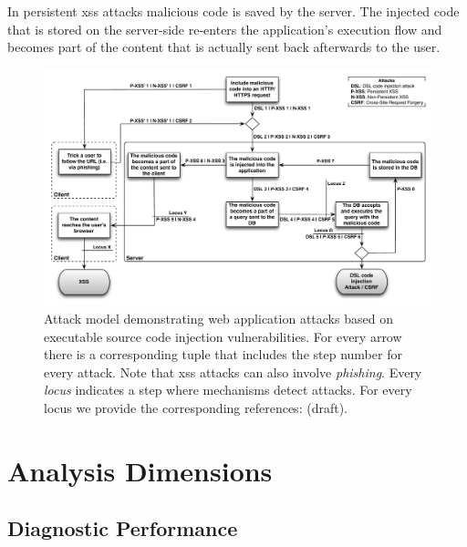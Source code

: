 \documentclass[conference]{IEEEtran}
\begin{document}
In persistent {\sc xss} attacks malicious code is saved by the server.
The injected code that is stored on the server-side re-enters the
application's execution flow and becomes part of the content that is
actually sent back afterwards to the user.

\begin{figure}
\begin{center}
\leavevmode
\includegraphics[scale=0.55]{attacks-steps.pdf}
\end{center}
\caption{\label{fig:attacks}Attack model demonstrating web
application attacks based on executable source
code injection vulnerabilities. For every arrow there is a
corresponding tuple that includes the step number for
every attack. Note that {\sc xss} attacks can also involve
{\it phishing}. Every {\it locus} indicates a step where mechanisms
detect attacks. For every locus we provide the corresponding
references: ({\sc draft}).}
\end{figure}

\section{Analysis Dimensions}
\label{sec:dimensions}

\subsection{Diagnostic Performance}
\end{document}
